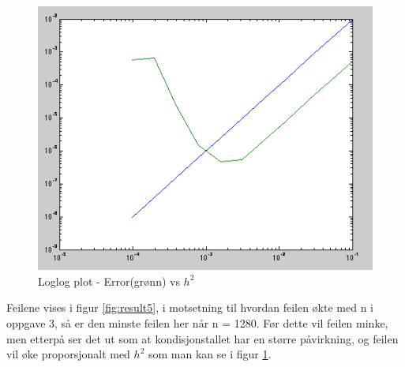 \begin{figure}[h!]
    \centering
    \includegraphics[width=1\textwidth]{sections/Exercise5/loglog5}
    \caption{Loglog plot - Error(grønn) vs $h^2$}
    \label{fig:loglog5}
\end{figure}


Feilene vises i figur \ref{fig:result5}, i motsetning til hvordan feilen økte med n i oppgave 3, så er den minste feilen her når n = 1280. Før dette vil feilen minke, men etterpå ser det ut som at kondisjonstallet har en større påvirkning, og feilen vil øke proporsjonalt med $h^2$ som man kan se i figur \ref{fig:loglog5}.


% 
